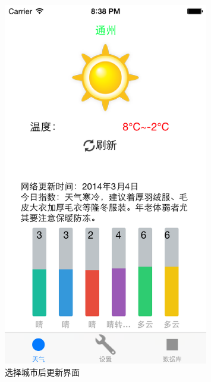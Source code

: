 \documentclass[UTF8,nofonts]{ctexart}
\begin{document}
\begin{figure}[hbt]
\centering
\includegraphics[width=0.8\textwidth]{4.png}
\caption{选择城市后更新界面}
\end{figure}
\end{document}
